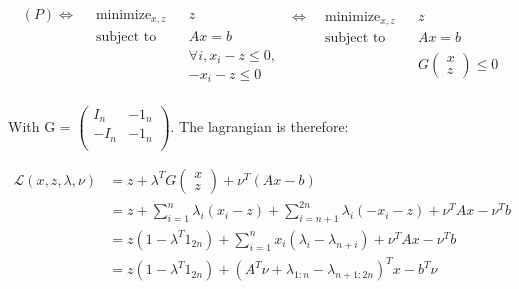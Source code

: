 \documentclass{article}
\begin{document}
\begin{equation*}
    \begin{aligned}
        (P)\Leftrightarrow\;\; & \text{minimize}_{x, z} &  & z                        \\
                               & \text{subject to}      &  & Ax = b                   \\
                               &                        &  & \forall i,x_i - z \le 0, \\
                               &                        &  & -x_i - z \le 0           \\
    \end{aligned}
    \;
    \begin{aligned}
        \Leftrightarrow\;\; & \text{minimize}_{x, z} &  & z                                \\
                            & \text{subject to}      &  & Ax = b                           \\
                            &                        &  & G\begin{pmatrix} x \\ z\end{pmatrix} \le 0 \\
    \end{aligned}
\end{equation*}

With G = $\begin{pmatrix}I_n  & -1_n \\-I_n & -1_n \\\end{pmatrix}$. The lagrangian is therefore:

\begin{equation*}
    \begin{aligned}
        \mathcal{L}(x, z, \lambda, \nu) & = z + \lambda^T G \begin{pmatrix} x \\ z\end{pmatrix} + \nu^T(Ax - b)                                      \\
                                        & = z + \sum_{i=1}^{n} \lambda_i(x_i -z) + \sum_{i=n+1}^{2n} \lambda_i(-x_i -z) + \nu^TAx - \nu^Tb \\
                                        & = z(1 - \lambda^T1_{2n}) + \sum_{i=1}^{n} x_i(\lambda_i - \lambda_{n+i}) +  \nu^TAx - \nu^Tb     \\
                                        & = z(1 - \lambda^T1_{2n}) + (A^T\nu + \lambda_{1:n} - \lambda_{n+1:2n})^Tx - b^T\nu               \\
    \end{aligned}
\end{equation*}
\end{document}
